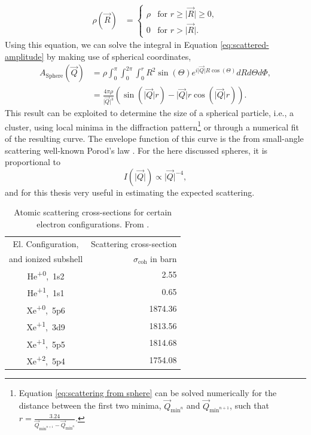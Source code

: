 \begin{align}
\rho\left(\vec{R}\right)&=\begin{cases}
\rho& \text{for $r \geq \lvert\vec{R}\rvert \geq 0$},\\
0&\text{for $r > \lvert\vec{R}\rvert$}.
\end{cases}
\label{eq:el-density}
\end{align}
Using this equation, we can solve the integral in Equation \eqref{eq:scattered-amplitude} by making use of spherical coordinates,
\begin{align}
A_{\text{Sphere}}\left(\vec{Q}\right) &= \rho \int_{0}^{\pi}\int_{0}^{2\pi}\int_{0}^{r} R^{2}  \sin\left(\Theta\right) e^{i \lvert\vec{Q}\rvert R \cos\left(\Theta\right)} dR d\Theta d\Phi,\\
&=\frac{4 \pi \rho}{\lvert\vec{Q}\rvert^{3}}\left(\sin\left(\lvert\vec{Q}\rvert r\right)-\lvert\vec{Q}\rvert r\cos\left(\lvert\vec{Q}\rvert r\right)\right).
\label{eq:scattering from sphere}
\end{align}
This result can be exploited to determine the size of a spherical particle, i.e., a cluster, using local minima in the diffraction pattern\footnote{Equation \eqref{eq:scattering from sphere} can be solved numerically for the distance between the first two minima, $\vec{Q}_{\text{min}^{n}}$ and $\vec{Q}_{\text{min}^{n+1}}$, such that $r=\frac{3.24}{\vec{Q}_{\text{min}^{n+1}}-\vec{Q}_{\text{min}^{n}}}$.} or through a numerical fit of the resulting curve. The envelope function of this curve is the from small-angle scattering well-known Porod's law \cite{Sinha-1988-PRB}. For the here discussed spheres, it is proportional to
\begin{equation}
I(\lvert\vec{Q}\rvert)\propto \lvert\vec{Q}\rvert^{-4},
\label{eq:porods-law}
\end{equation}
and for this thesis very useful in estimating the expected scattering.\\[1\baselineskip]
%
\begin{table}
	\centering
		\begin{tabular}{ | c | r | }
		\hline
			El. Configuration, & Scattering cross-section \\
			and ionized subshell & $\sigma_{\text{coh}}$ in barn \\ \hline
			He\textsuperscript{+0},\ 1s2 & 2.55  \\ \hline
			He\textsuperscript{+1},\ 1s1 & 0.65  \\ \hline
			Xe\textsuperscript{+0},\ 5p6 & 1874.36  \\ \hline
			Xe\textsuperscript{+1},\ 3d9 & 1813.56  \\ \hline
			Xe\textsuperscript{+1},\ 5p5 & 1814.68  \\ \hline
			Xe\textsuperscript{+2},\ 5p4 & 1754.08  \\ \hline
		\end{tabular}
	\caption[Atomic scattering factors for helium and xenon.]{Atomic scattering cross-sections for certain electron configurations. From \citep{Ho-2016-PC}.}
	\label{tab:helium-xenon-el-scattering-crossection}
\end{table}

